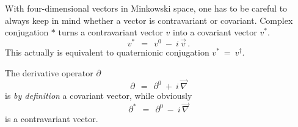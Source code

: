 \documentclass[epsfig,12pt]{article}
\begin{document}
	With four-dimensional vectors in Minkowski space, one has to be careful to always keep in mind whether
	a vector is contravariant or covariant.
	Complex conjugation $ * $ turns a contravariant vector $ v $ into a covariant vector $ v^* $.
\begin{equation}
	v^*	~~=~~	v^0  ~-~  i\,\vec v\,.
\end{equation}
	This actually is equivalent to quaternionic conjugation $ v^*  ~=~ v^\dag $.

	The derivative operator $ \partial $
\begin{equation}
	\partial	~~=~~	\partial^0  ~+~  i\,\vec\nabla
\end{equation}
	is \emph{by definition} a covariant vector, while obviously
\begin{equation}
	\partial^*	~~=~~	\partial^0  ~-~  i\,\vec\nabla
\end{equation}
	is a contravariant vector.
\end{document}
